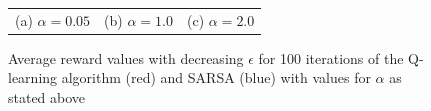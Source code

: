 \documentclass{article}
\begin{document}
\begin{figure}
\begin{tabular}{ccc}
  (a) $\alpha=0.05$ & (b) $\alpha=1.0$  & (c) $\alpha=2.0$\\[6pt]
  \end{tabular}
  \caption{Average reward values with decreasing $\epsilon$ for 100 iterations of the Q-learning algorithm (red) and SARSA (blue) with values for $\alpha$ as stated above}
  \end{figure}
	
	
\end{document}
